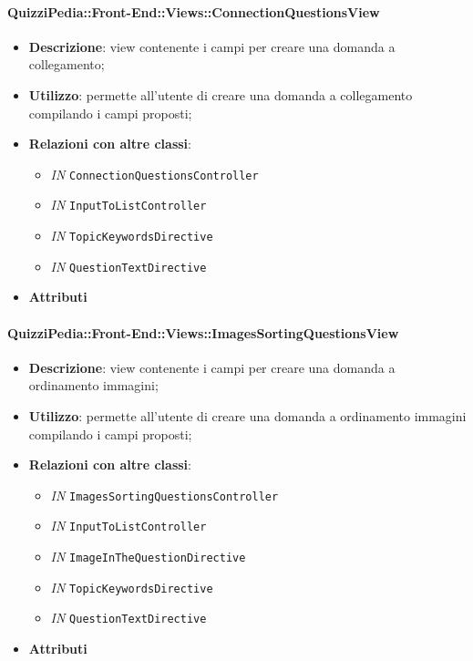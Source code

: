 \paragraph{QuizziPedia::Front-End::Views::ConnectionQuestionsView}
\begin{itemize}
	\item \textbf{Descrizione}: view contenente i campi per creare una domanda a collegamento;
	\item \textbf{Utilizzo}: permette all'utente di creare una domanda a collegamento compilando i campi proposti;
	\item \textbf{Relazioni con altre classi}:
	\begin{itemize}
		\item \textit{IN} \texttt{ConnectionQuestionsController} \\
		\item \textit{IN} \texttt{InputToListController} \\
		\item \textit{IN} \texttt{TopicKeywordsDirective} \\
		\item \textit{IN} \texttt{QuestionTextDirective} \\ 
	\end{itemize}
	\item \textbf{Attributi}
\end{itemize}

\paragraph{QuizziPedia::Front-End::Views::ImagesSortingQuestionsView}
\begin{itemize}
	\item \textbf{Descrizione}: view contenente i campi per creare una domanda a ordinamento immagini;
	\item \textbf{Utilizzo}: permette all'utente di creare una domanda a ordinamento immagini compilando i campi proposti;
	\item \textbf{Relazioni con altre classi}:
	\begin{itemize}
		\item \textit{IN} \texttt{ImagesSortingQuestionsController} \\
		\item \textit{IN} \texttt{InputToListController} \\
		\item \textit{IN} \texttt{ImageInTheQuestionDirective} \\
		\item \textit{IN} \texttt{TopicKeywordsDirective} \\
		\item \textit{IN} \texttt{QuestionTextDirective} \\ 
	\end{itemize}
	\item \textbf{Attributi}
\end{itemize}

